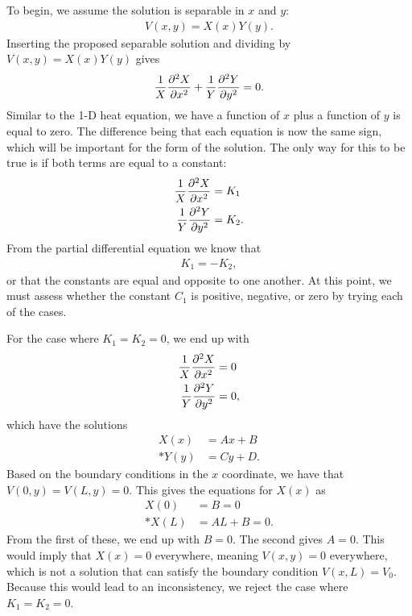 To begin, we assume the solution is separable in $x$ and $y$:
\begin{align}
  V(x,y) = X(x) Y(y) .
\end{align}
Inserting the proposed separable solution and dividing by $V(x,y) = X(x)Y(y)$ gives
\begin{align}
  \frac{1}{X} \frac{ \partial^2 {X} }{ \partial {x}^2 } + \frac{1}{Y} \frac{ \partial^2 {Y} }{ \partial {y}^2 } = 0.
\end{align}
Similar to the 1-D heat equation, we have a function of $x$ plus a function of $y$ is equal to zero. The difference being that each equation is now the same sign, which will be important for the form of the solution. The only way for this to be true is if both terms are equal to a constant:
\begin{subequations}
\begin{align}
  \frac{1}{X} \frac{ \partial^2 {X} }{ \partial {x}^2 } &= K_1 \\*
  \frac{1}{Y} \frac{ \partial^2 {Y} }{ \partial {y}^2 } &= K_2 .
\end{align}
\end{subequations}
From the partial differential equation we know that
\begin{align}
  K_1 = -K_2 ,
\end{align}
or that the constants are equal and opposite to one another. At this point, we must assess whether the constant $C_1$ is positive, negative, or zero by trying each of the cases. 

For the case where $K_1 = K_2 = 0$, we end up with
\begin{subequations}
\begin{align}
  \frac{1}{X} \frac{ \partial^2 {X} }{ \partial {x}^2 } &= 0 \\*
  \frac{1}{Y} \frac{ \partial^2 {Y} }{ \partial {y}^2 } &= 0 ,
\end{align}
\end{subequations}
which have the solutions
\begin{subequations}
\begin{align}
  X(x) &= A x + B \\*
  Y(y) &= C y + D .
\end{align}
\end{subequations}
Based on the boundary conditions in the $x$ coordinate, we have that $V(0,y) = V(L,y) = 0$. This gives the equations for $X(x)$ as
\begin{subequations}
\begin{align}
  X(0) &= B = 0 \\*
  X(L) &= A L + B  = 0.
\end{align}
\end{subequations}
From the first of these, we end up with $B = 0$. The second gives $A = 0$. This would imply that $X(x) = 0$ everywhere, meaning $V(x,y) = 0$ everywhere, which is not a solution that can satisfy the boundary condition $V(x,L) = V_0$. Because this would lead to an inconsistency, we reject the case where $K_1 = K_2 = 0$.

